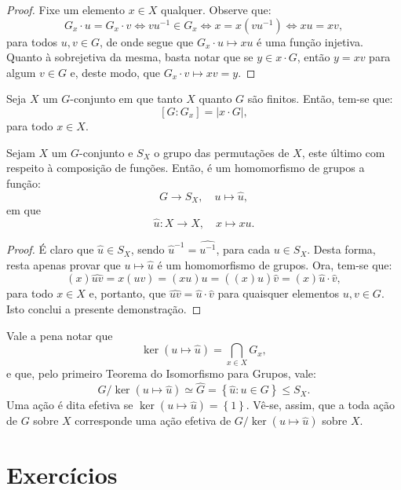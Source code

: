 \begin{proof}
  Fixe um elemento $x\in{X}$ qualquer. Observe que:
  \[
    G_{x}\cdot{u}=G_{x}\cdot{v}\iff{vu^{-1}\in{G_{x}}}\iff{x=x(vu^{-1})}\iff{xu=xv},
  \]
  para todos $u,v\in{G}$, de onde segue que $G_{x}\cdot{u}\mapsto{xu}$ é uma função injetiva. Quanto à sobrejetiva da mesma, basta notar que se $y\in{x\cdot{G}}$, então $y=xv$ para algum $v\in{G}$ e, deste modo, que $G_{x}\cdot{v}\mapsto{xv}=y$.
\end{proof}

\begin{corollary}
  Seja $X$ um $G$-conjunto em que tanto $X$ quanto $G$ são finitos. Então, tem-se que:
  \[
    [G:G_{x}]=|x\cdot{G}|,
  \]
  para todo $x\in{X}$.
\end{corollary}

\begin{proposition}
  Sejam $X$ um $G$-conjunto e $S_{X}$ o grupo das permutações de $X$, este último com respeito à composição de funções. Então, é um homomorfismo de grupos a função:
  \[
    G\to{S_{X}},\quad{u\mapsto\widehat{u}},
  \]
  em que
  \[
    \widehat{u}:X\to{X},\quad{x\mapsto{xu}}.
  \]
\end{proposition}

\begin{proof}
  É claro que $\widehat{u}\in{S_{X}}$, sendo $\widehat{u}^{-1}=\widehat{u^{-1}}$, para cada $u\in{S_{X}}$. Desta forma, resta apenas provar que $u\mapsto{\widehat{u}}$ é um homomorfismo de grupos. Ora, tem-se que:
  \[
    (x)\widehat{uv}=x(uv)=(xu)u=((x)\widehat{u})\widehat{v}=(x)\widehat{u}\cdot\widehat{v},
  \]
  para todo $x\in{X}$ e, portanto, que $\widehat{uv}=\widehat{u}\cdot\widehat{v}$ para quaisquer elementos $u,v\in{G}$. Isto conclui a presente demonstração.
\end{proof}

Vale a pena notar que
\[
  \ker\left(u\mapsto{\widehat{u}}\right)=\bigcap_{x\in{X}}G_{x},
\]
e que, pelo primeiro Teorema do Isomorfismo para Grupos, vale:
\[
  G/\ker\left(u\mapsto{\widehat{u}}\right)\simeq\widehat{G}=\left\{\widehat{u}:u\in{G}\right\}\leqslant{S_{X}}.
\]
Uma ação é dita efetiva se $\ker\left(u\mapsto{\widehat{u}}\right)=\left\{1\right\}$. Vê-se, assim, que a toda ação de $G$ sobre $X$ corresponde uma ação efetiva de $G/\ker\left(u\mapsto\widehat{u}\right)$ sobre $X$.

\section*{Exercícios}

